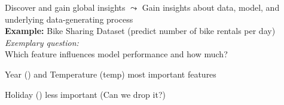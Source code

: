 \documentclass[10pt,compress,t,notes=noshow, xcolor=table]{beamer}
\begin{document}




\begin{framev}[align=top]{Discover and gain global insights}
$\leadsto$ Gain insights about data, model, and underlying data-generating process \\
\spacer[0.25]
\textbf{Example:} Bike Sharing Dataset (predict number of bike rentals per day) \\
\textit{Exemplary question:}\\
Which feature influences model performance and how much?
\begin{itemizeM}
\item Year () and Temperature (temp) most important features
\item Holiday () less important (Can we drop it?)
\end{itemizeM}
\end{framev}


\end{document}
